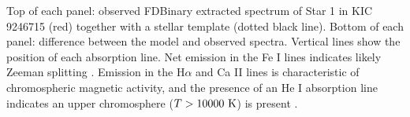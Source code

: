 \label{fig:emission1} Top of each panel: observed FDBinary extracted spectrum of Star 1 in KIC 9246715 (red) together with a stellar template (dotted black line). Bottom of each panel: difference between the model and observed spectra. Vertical lines show the position of each absorption line. Net emission in the Fe I lines indicates likely Zeeman splitting \citep{har73}. Emission in the H$\alpha$ and Ca II lines is characteristic of chromospheric magnetic activity, and the presence of an He I absorption line indicates an upper chromosphere ($T > 10000 \ \rm{K}$) is present \citep{fro12}.
  
  
  